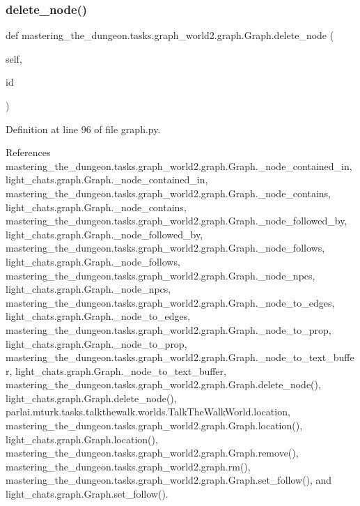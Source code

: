 \subsubsection{\texorpdfstring{delete\+\_\+node()}{delete\_node()}}
{\footnotesize\ttfamily def mastering\+\_\+the\+\_\+dungeon.\+tasks.\+graph\+\_\+world2.\+graph.\+Graph.\+delete\+\_\+node (\begin{DoxyParamCaption}\item[{}]{self,  }\item[{}]{id }\end{DoxyParamCaption})}



Definition at line 96 of file graph.\+py.



References mastering\+\_\+the\+\_\+dungeon.\+tasks.\+graph\+\_\+world2.\+graph.\+Graph.\+\_\+node\+\_\+contained\+\_\+in, light\+\_\+chats.\+graph.\+Graph.\+\_\+node\+\_\+contained\+\_\+in, mastering\+\_\+the\+\_\+dungeon.\+tasks.\+graph\+\_\+world2.\+graph.\+Graph.\+\_\+node\+\_\+contains, light\+\_\+chats.\+graph.\+Graph.\+\_\+node\+\_\+contains, mastering\+\_\+the\+\_\+dungeon.\+tasks.\+graph\+\_\+world2.\+graph.\+Graph.\+\_\+node\+\_\+followed\+\_\+by, light\+\_\+chats.\+graph.\+Graph.\+\_\+node\+\_\+followed\+\_\+by, mastering\+\_\+the\+\_\+dungeon.\+tasks.\+graph\+\_\+world2.\+graph.\+Graph.\+\_\+node\+\_\+follows, light\+\_\+chats.\+graph.\+Graph.\+\_\+node\+\_\+follows, mastering\+\_\+the\+\_\+dungeon.\+tasks.\+graph\+\_\+world2.\+graph.\+Graph.\+\_\+node\+\_\+npcs, light\+\_\+chats.\+graph.\+Graph.\+\_\+node\+\_\+npcs, mastering\+\_\+the\+\_\+dungeon.\+tasks.\+graph\+\_\+world2.\+graph.\+Graph.\+\_\+node\+\_\+to\+\_\+edges, light\+\_\+chats.\+graph.\+Graph.\+\_\+node\+\_\+to\+\_\+edges, mastering\+\_\+the\+\_\+dungeon.\+tasks.\+graph\+\_\+world2.\+graph.\+Graph.\+\_\+node\+\_\+to\+\_\+prop, light\+\_\+chats.\+graph.\+Graph.\+\_\+node\+\_\+to\+\_\+prop, mastering\+\_\+the\+\_\+dungeon.\+tasks.\+graph\+\_\+world2.\+graph.\+Graph.\+\_\+node\+\_\+to\+\_\+text\+\_\+buffer, light\+\_\+chats.\+graph.\+Graph.\+\_\+node\+\_\+to\+\_\+text\+\_\+buffer, mastering\+\_\+the\+\_\+dungeon.\+tasks.\+graph\+\_\+world2.\+graph.\+Graph.\+delete\+\_\+node(), light\+\_\+chats.\+graph.\+Graph.\+delete\+\_\+node(), parlai.\+mturk.\+tasks.\+talkthewalk.\+worlds.\+Talk\+The\+Walk\+World.\+location, mastering\+\_\+the\+\_\+dungeon.\+tasks.\+graph\+\_\+world2.\+graph.\+Graph.\+location(), light\+\_\+chats.\+graph.\+Graph.\+location(), mastering\+\_\+the\+\_\+dungeon.\+tasks.\+graph\+\_\+world2.\+graph.\+Graph.\+remove(), mastering\+\_\+the\+\_\+dungeon.\+tasks.\+graph\+\_\+world2.\+graph.\+rm(), mastering\+\_\+the\+\_\+dungeon.\+tasks.\+graph\+\_\+world2.\+graph.\+Graph.\+set\+\_\+follow(), and light\+\_\+chats.\+graph.\+Graph.\+set\+\_\+follow().



